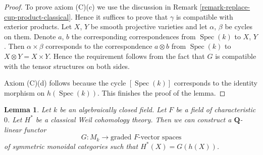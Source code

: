 \documentclass{stacks-project}
\theoremstyle{plain}
\newtheorem{lemma}[subsection]{Lemma}
\theoremstyle{definition}
\theoremstyle{remark}
\numberwithin{equation}{subsection}
\def\Spec{\mathop{\mathrm{Spec}}}
\begin{document}
\begin{proof}
\medskip\noindent
To prove axiom (C)(c) we use the discussion in
Remark \ref{remark-replace-cup-product-classical}.
Hence it suffices to prove that $\gamma$ is compatible with
exterior products. Let $X$, $Y$ be smooth projective varieties and
let $\alpha$, $\beta$ be cycles on them. Denote
$a$, $b$ the corresponding correspondences from $\Spec(k)$ to
$X$, $Y$. Then $\alpha \times \beta$ corresponds to the
correspondence $a \otimes b$ from $\Spec(k)$ to $X \otimes Y = X \times Y$.
Hence the requirement follows from the fact that $G$ is
compatible with the tensor structures on both sides.

\medskip\noindent
Axiom (C)(d) follows because the cycle $[\Spec(k)]$
corresponds to the identity morphism on $h(\Spec(k))$.
This finishes the proof of the lemma.
\end{proof}

\begin{lemma}
\label{lemma-from-weil-to-functor-classical}
Let $k$ be an algebraically closed field. Let $F$ be a field of
characteristic $0$. Let $H^*$ be a classical Weil cohomology theory.
Then we can construct a $\mathbf{Q}$-linear functor
$$
G : M_k \longrightarrow \text{graded }F\text{-vector spaces}
$$
of symmetric monoidal categories such that $H^*(X) = G(h(X))$.
\end{lemma}
\end{document}
